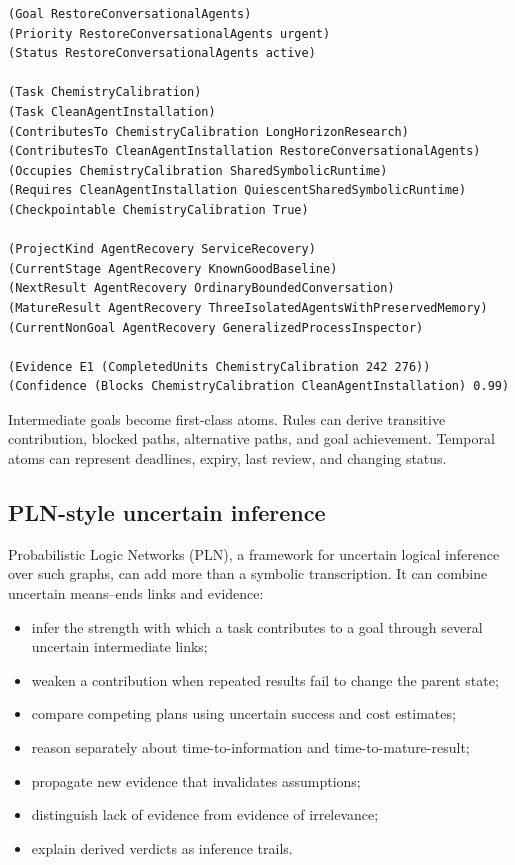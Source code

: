 \documentclass[11pt,letterpaper]{article}
\begin{document}
\begin{lstlisting}[style=plain]
(Goal RestoreConversationalAgents)
(Priority RestoreConversationalAgents urgent)
(Status RestoreConversationalAgents active)

(Task ChemistryCalibration)
(Task CleanAgentInstallation)
(ContributesTo ChemistryCalibration LongHorizonResearch)
(ContributesTo CleanAgentInstallation RestoreConversationalAgents)
(Occupies ChemistryCalibration SharedSymbolicRuntime)
(Requires CleanAgentInstallation QuiescentSharedSymbolicRuntime)
(Checkpointable ChemistryCalibration True)

(ProjectKind AgentRecovery ServiceRecovery)
(CurrentStage AgentRecovery KnownGoodBaseline)
(NextResult AgentRecovery OrdinaryBoundedConversation)
(MatureResult AgentRecovery ThreeIsolatedAgentsWithPreservedMemory)
(CurrentNonGoal AgentRecovery GeneralizedProcessInspector)

(Evidence E1 (CompletedUnits ChemistryCalibration 242 276))
(Confidence (Blocks ChemistryCalibration CleanAgentInstallation) 0.99)
\end{lstlisting}

Intermediate goals become first-class atoms. Rules can derive transitive
contribution, blocked paths, alternative paths, and goal achievement. Temporal
atoms can represent deadlines, expiry, last review, and changing status.

\subsection{PLN-style uncertain inference}

Probabilistic Logic Networks (PLN), a framework for uncertain logical
inference over such graphs, can add more than a symbolic transcription. It can combine uncertain
means--ends links and evidence:

\begin{itemize}
  \item infer the strength with which a task contributes to a goal through
        several uncertain intermediate links;
  \item weaken a contribution when repeated results fail to change the parent
        state;
  \item compare competing plans using uncertain success and cost estimates;
  \item reason separately about time-to-information and time-to-mature-result;
  \item propagate new evidence that invalidates assumptions;
  \item distinguish lack of evidence from evidence of irrelevance;
  \item explain derived verdicts as inference trails.
\end{itemize}
\end{document}

